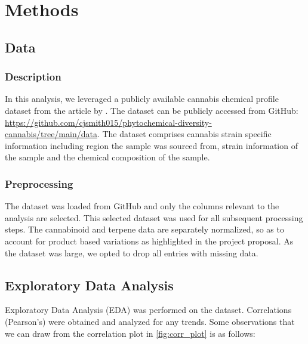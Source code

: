 \documentclass[11pt,a4paper]{article}
\begin{document}
\section{Methods}
\subsection{Data}
\subsubsection{Description}
In this analysis, we leveraged a publicly available cannabis chemical profile dataset from the article by \cite{smith2022phytochemical}. The dataset can be publicly accessed from GitHub: \url{https://github.com/cjsmith015/phytochemical-diversity-cannabis/tree/main/data}. The dataset comprises cannabis strain specific information including region the sample was sourced from, strain information of the sample and the chemical composition of the sample.


\subsubsection{Preprocessing}
The dataset was loaded from GitHub and only the columns relevant to the analysis are selected. This selected dataset was used for all subsequent processing steps. The cannabinoid and terpene data are separately normalized, so as to account for product based variations as highlighted in the project proposal. As the dataset was large, we opted to drop all entries with missing data.\\

\subsection{Exploratory Data Analysis}
Exploratory Data Analysis (EDA) was performed on the dataset. Correlations (Pearson's) were obtained and analyzed for any trends. Some observations that we can draw from the correlation plot in \autoref{fig:corr_plot} is as follows:
\end{document}
